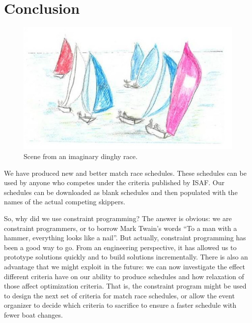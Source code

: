 \documentclass{llncs}
\begin{document}
\section{Conclusion}\label{sec:conclusions}
\begin{figure}[tb]
    \centering
    \includegraphics[keepaspectratio=true,width=4.6in]{dinghy.jpg}
\caption{Scene from an imaginary dinghy race.}
\label{dinghy}
\end{figure}

We have produced new and better match race schedules. These schedules can be used by anyone who
competes under the criteria published by ISAF. Our schedules can be downloaded as blank schedules
and then populated with the names of the actual competing skippers.

So, why did we use constraint programming? The answer is obvious:  we are constraint programmers, or
to borrow Mark Twain's words ``To a man with a hammer, everything looks like a nail''. But actually,
constraint programming has been a good way to go. From an engineering perspective, it has allowed us
to prototype solutions quickly and to build solutions incrementally. There is also an advantage that
we might exploit in the future: we can now investigate the effect different criteria have on our
ability to produce schedules and how relaxation of those affect optimization criteria. That is, the
constraint program might be used to design the next set of criteria for match race schedules, or
allow the event organizer to decide which criteria to sacrifice to ensure a faster schedule with
fewer boat changes.



\end{document}
